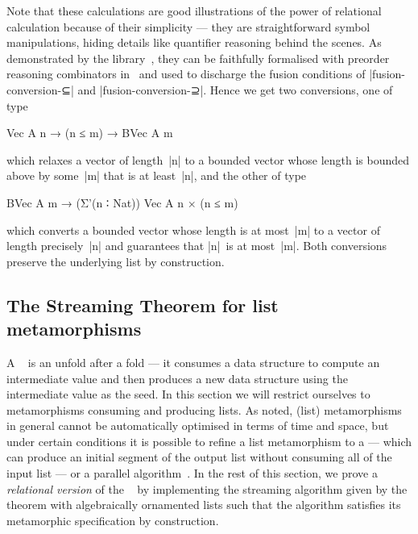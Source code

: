 Note that these calculations are good illustrations of the power of relational calculation because of their simplicity --- they are straightforward symbol manipulations, hiding details like quantifier reasoning behind the scenes.
As demonstrated by the  library~\citep{Mu-AoPA}, they can be faithfully formalised with preorder reasoning combinators in \Agda\ and used to discharge the fusion conditions of |fusion-conversion-⊆| and |fusion-conversion-⊇|.
Hence we get two conversions, one of type
\begin{code}
Vec A n → (n ≤ m) → BVec A m
\end{code}
which relaxes a vector of length~|n| to a bounded vector whose length is bounded above by some~|m| that is at least~|n|, and the other of type
\begin{code}
BVec A m → (Σ'(n ∶ Nat)) Vec A n × (n ≤ m)
\end{code}
which converts a bounded vector whose length is at most~|m| to a vector of length precisely~|n| and guarantees that |n|~is at most~|m|.
Both conversions preserve the underlying list by construction.

\subsection{The Streaming Theorem for list metamorphisms}
\label{sec:metamorphism-streaming}

A ~\citep{Gibbons-metamorphisms} is an unfold after a fold --- it consumes a data structure to compute an intermediate value and then produces a new data structure using the intermediate value as the seed.
In this section we will restrict ourselves to metamorphisms consuming and producing lists.
As \citeauthor{Gibbons-metamorphisms} noted, (list) metamorphisms in general cannot be automatically optimised in terms of time and space, but under certain conditions it is possible to refine a list metamorphism to a  --- which can produce an initial segment of the output list without consuming all of the input list --- or a parallel algorithm~\citep{Nakano-jigsaw}.
In the rest of this section, we prove a \emph{relational version} of the ~\citep[Theorem~30]{Bird-arithmetic-coding} by implementing the streaming algorithm given by the theorem with algebraically ornamented lists such that the algorithm satisfies its metamorphic specification by construction.

